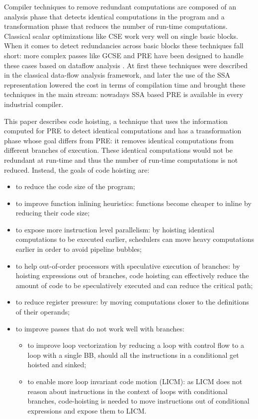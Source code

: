 \documentclass{sig-alternate}
\begin{document}
Compiler techniques to remove redundant computations are composed of an analysis
phase that detects identical computations in the program and a transformation
phase that reduces the number of run-time computations.  Classical scalar
optimizations like CSE \cite{dragonbook} work very well on single basic blocks.
When it comes to detect redundancies across basic blocks these techniques fall
short: more complex passes like GCSE and PRE have been designed to handle these
cases based on dataflow analysis \cite{morel1979global}.  At first these
techniques were described in the classical data-flow analysis framework, and
later the use of the SSA representation lowered the cost in terms of compilation
time \cite{briggs1994effective,chow1997new,kennedy1999partial} and brought these
techniques in the main stream: nowadays SSA based PRE is available in every
industrial compiler.

This paper describes code hoisting, a technique that uses the information
computed for PRE to detect identical computations and has a transformation phase
whose goal differs from PRE: it removes identical computations from different
branches of execution.  These identical computations would not be redundant at
run-time and thus the number of run-time computations is not reduced.  Instead,
the goals of code hoisting are:
\begin{itemize}
\item to reduce the code size of the program;
\item to improve function inlining heuristics: functions become cheaper to
  inline by reducing their code size;
\item to expose more instruction level parallelism: by hoisting identical
  computations to be executed earlier, schedulers can move heavy computations
  earlier in order to avoid pipeline bubbles;
\item to help out-of-order processors with speculative execution of branches: by
  hoisting expressions out of branches, code hoisting can effectively reduce the
  amount of code to be speculatively executed and can reduce the critical path;
\item to reduce register pressure: by moving computations closer to the
  definitions of their operands;
\item to improve passes that do not work well with branches:
  \begin{itemize}
  \item to improve loop vectorization by reducing a loop with control flow to a
    loop with a single BB, should all the instructions in a conditional get
    hoisted and sinked;
  \item to enable more loop invariant code motion (LICM): as LICM does not
    reason about instructions in the context of loops with conditional branches,
    code-hoisting is needed to move instructions out of conditional expressions
    and expose them to LICM.
  \end{itemize}
\end{itemize}
\end{document}
